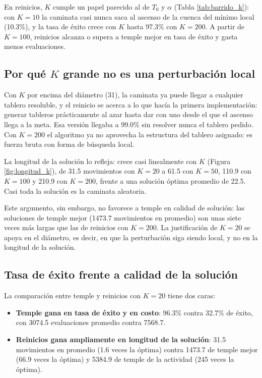 \documentclass[12pt,a4paper]{article}
\begin{document}
En reinicios, $K$ cumple un papel parecido al de $T_0$ y $\alpha$
(Tabla \ref{tab:barrido_k}): con $K = 10$ la caminata casi nunca saca
al ascenso de la cuenca del mínimo local (10.3\%), y la tasa de éxito
crece con $K$ hasta 97.3\% con $K = 200$. A partir de $K = 100$,
reinicios alcanza o supera a temple mejor en tasa de éxito y gasta
menos evaluaciones.

\subsection{Por qué \texorpdfstring{$K$}{K} grande no es una perturbación local}

Con $K$ por encima del diámetro (31), la caminata ya puede llegar a
cualquier tablero resoluble, y el reinicio se acerca a lo que hacía la
primera implementación: generar tableros prácticamente al azar hasta
dar con uno desde el que el ascenso llega a la meta. Esa versión
llegaba a 99.0\% sin resolver nunca el tablero pedido. Con $K = 200$ el
algoritmo ya no aprovecha la estructura del tablero asignado: es fuerza
bruta con forma de búsqueda local.

La longitud de la solución lo refleja: crece casi linealmente con $K$
(Figura \ref{fig:longitud_k}), de 31.5 movimientos con $K = 20$ a 61.5
con $K = 50$, 110.9 con $K = 100$ y 210.9 con $K = 200$, frente a una
solución óptima promedio de 22.5. Casi toda la solución es la caminata
aleatoria.

Este argumento, sin embargo, no favorece a temple en calidad de
solución: las soluciones de temple mejor (1473.7 movimientos en
promedio) son unas siete veces más largas que las de reinicios con
$K = 200$. La justificación de $K = 20$ se apoya en el diámetro, es
decir, en que la perturbación siga siendo local, y no en la longitud de
la solución.

\subsection{Tasa de éxito frente a calidad de la solución}

La comparación entre temple y reinicios con $K = 20$ tiene dos caras:

\begin{itemize}
    \item \textbf{Temple gana en tasa de éxito y en costo}: 96.3\%
    contra 32.7\% de éxito, con 3074.5 evaluaciones promedio contra
    7568.7.
    \item \textbf{Reinicios gana ampliamente en longitud de la
    solución}: 31.5 movimientos en promedio (1.6 veces la óptima)
    contra 1473.7 de temple mejor (66.9 veces la óptima) y 5384.9 de
    temple de la actividad (245 veces la óptima).
\end{itemize}
\end{document}

